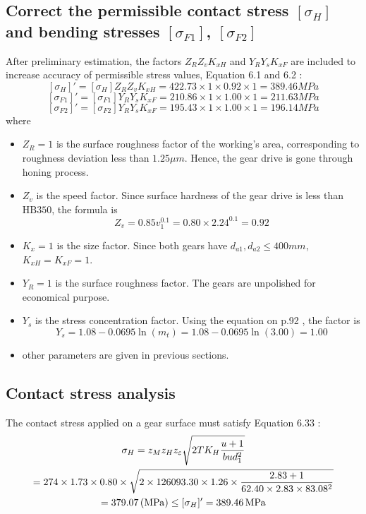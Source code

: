 \subsection{Correct the permissible contact stress $ [\sigma_H] $ and bending stresses $ [\sigma_{F1}] $, $ [\sigma_{F2}] $}
After preliminary estimation, the factors $ Z_RZ_vK_{xH} $ and $ Y_RY_sK_{xF} $ are included to increase accuracy of permissible stress values, Equation 6.1 and 6.2 \cite{tk1}:\\
\[[\sigma_H]'=[\sigma_H]Z_RZ_vK_{xH} = 422.73\times 1\times 0.92\times 1 = 389.46\unit{MPa}\]
\[[\sigma_{F1}]'=[\sigma_{F1}]Y_RY_sK_{xF} = 210.86\times 1\times 1.00\times 1 = 211.63\unit{MPa}\]
\[[\sigma_{F2}]'=[\sigma_{F2}]Y_RY_sK_{xF} = 195.43\times 1\times 1.00\times 1 = 196.14\unit{MPa}\]
where
\begin{itemize}
	\item $ Z_R = 1 $ is the surface roughness factor of the working's area, corresponding to roughness deviation  less than $ 1.25\unit{\mu m} $. Hence, the gear drive is gone through honing process.
	\item $ Z_v $ is the speed factor. Since surface hardness of the gear drive is less than $ \text{HB}350 $, the formula is
	\[ Z_v = 0.85v_1^{0.1} = 0.80\times 2.24^{0.1} = 0.92 \]
	\item $ K_x = 1$ is the size factor. Since both gears have $ d_{a1}, d_{a2} \leq 400\unit{mm} $, $ K_{xH}=K_{xF}=1 $.
	\item $ Y_R=1 $ is the surface roughness factor. The gears are unpolished for economical purpose.
	\item $ Y_s $ is the stress concentration factor. Using the equation on p.92 \cite{tk1}, the factor is
	\[Y_s = 1.08-0.0695\ln(m_t) = 1.08-0.0695\ln(3.00) = 1.00\]
	\item other parameters are given in previous sections.
\end{itemize}

\subsection{Contact stress analysis}

The contact stress applied on a gear surface must satisfy Equation 6.33 \cite{tk1}:
\begin{multline*}
\sigma_H = z_Mz_Hz_\varepsilon\sqrt{2TK_H\dfrac{u+1}{bud_1^2}} \\
= 274\times 1.73 \times 0.80 \times \sqrt{2\times 126093.30 \times 1.26 \times\dfrac{2.83+1}{62.40 \times 2.83 \times 83.08^2}}\\
= 379.07 \, (\mathrm{MPa}) \leq [\sigma_H]' = 389.46 \, \mathrm{MPa}
\end{multline*}

